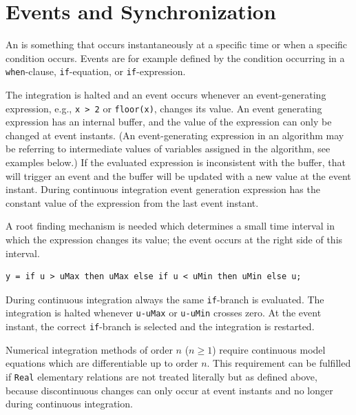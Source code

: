 \section{Events and Synchronization}\label{events-and-synchronization}

An  is something that occurs instantaneously at a specific time or when a specific condition occurs.
Events are for example defined by the condition occurring in a \lstinline!when!-clause, \lstinline!if!-equation, or \lstinline!if!-expression.

The integration is halted and an event occurs whenever an event-generating expression, e.g., \lstinline!x > 2! or \lstinline!floor(x)!, changes its value.
An event generating expression has an internal buffer, and the value of the expression can only be changed at event instants.
(An event-generating expression in an algorithm may be referring to intermediate values of variables assigned in the algorithm, see examples below.)
If the evaluated expression is inconsistent with the buffer, that will trigger an event and the buffer will be updated with a new value at the event instant.
During continuous integration event generation expression has the constant value of the expression from the last event instant.

\begin{nonnormative}
A root finding mechanism is needed which determines a small time interval in which the expression changes its value; the event occurs at the right side of this interval.
\end{nonnormative}

\begin{example}
\begin{lstlisting}[language=modelica]
y = if u > uMax then uMax else if u < uMin then uMin else u;
\end{lstlisting}

During continuous integration always the same \lstinline!if!-branch is evaluated.
The integration is halted whenever \lstinline!u-uMax! or \lstinline!u-uMin! crosses zero.
At the event instant, the correct \lstinline!if!-branch is selected and the integration is restarted.

Numerical integration methods of order $n$ ($n \geq 1$) require continuous model equations which are differentiable up to order $n$.
This requirement can be fulfilled if \lstinline!Real! elementary relations are not treated literally but as defined above, because discontinuous changes can only occur at event instants and no longer during continuous integration.
\end{example}

